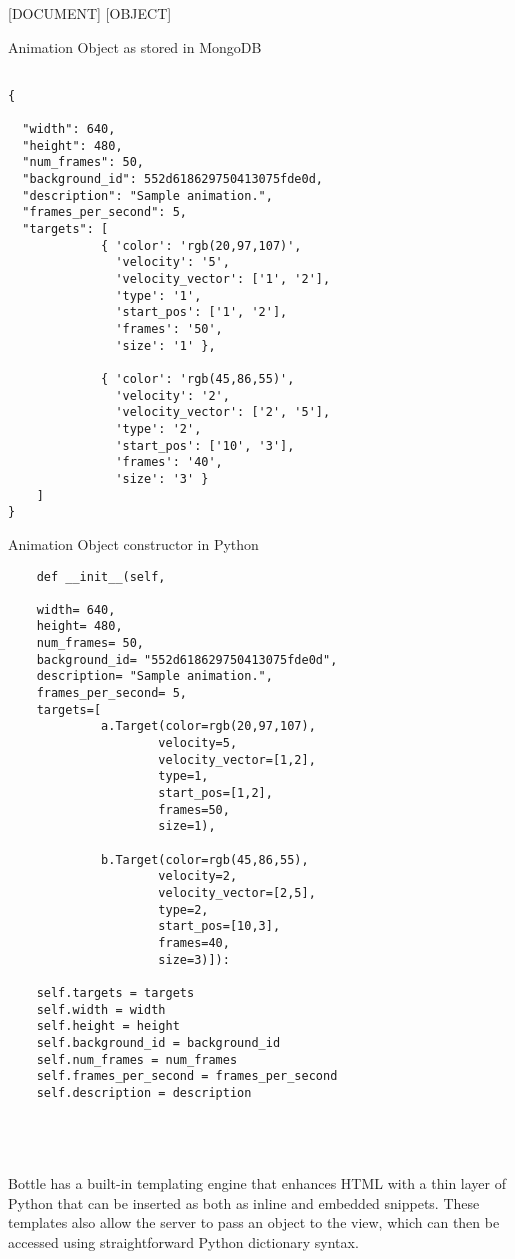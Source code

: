 \documentclass[a4paper,11pt]{article}
\begin{document}
[DOCUMENT] [OBJECT]


 \begin{minipage}[t]{0.5\textwidth}
  \centering  
  Animation Object as stored in MongoDB
  \begin{verbatim}
  
{

  "width": 640,
  "height": 480,
  "num_frames": 50,
  "background_id": 552d618629750413075fde0d,
  "description": "Sample animation.",
  "frames_per_second": 5,
  "targets": [
             { 'color': 'rgb(20,97,107)',
               'velocity': '5',
               'velocity_vector': ['1', '2'],
               'type': '1',
               'start_pos': ['1', '2'],
               'frames': '50',
               'size': '1' },
                  
             { 'color': 'rgb(45,86,55)',
               'velocity': '2',
               'velocity_vector': ['2', '5'],
               'type': '2',
               'start_pos': ['10', '3'],
               'frames': '40',
               'size': '3' }
    ]
}
  \end{verbatim}
 \end{minipage} 
 \begin{minipage}[t]{0.5\textwidth}
  \centering  
  Animation Object constructor in Python
  \begin{verbatim}	
    def __init__(self,

    width= 640,
    height= 480,    
    num_frames= 50,
    background_id= "552d618629750413075fde0d",
    description= "Sample animation.",
    frames_per_second= 5,
    targets=[
             a.Target(color=rgb(20,97,107),
                     velocity=5,
                     velocity_vector=[1,2],
                     type=1,
                     start_pos=[1,2],
                     frames=50,
                     size=1),
                     
             b.Target(color=rgb(45,86,55),
                     velocity=2,
                     velocity_vector=[2,5],
                     type=2,
                     start_pos=[10,3],
                     frames=40,
                     size=3)]):

    self.targets = targets
    self.width = width
    self.height = height
    self.background_id = background_id
    self.num_frames = num_frames
    self.frames_per_second = frames_per_second
    self.description = description
  \end{verbatim}
 \end{minipage}
\\
\\
\\ 
Bottle has a built-in templating engine that enhances HTML with a thin layer of Python that can be inserted as both as inline and embedded snippets. These templates also allow the server to pass an object to the view, which can then be accessed using straightforward Python dictionary syntax.
\end{document}
